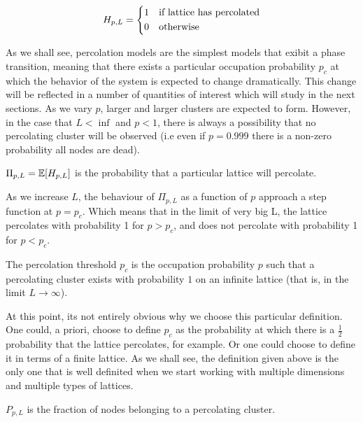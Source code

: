 \begin{defn}
\[
	H_{p,L} =
    \begin{dcases}
        1 & \text{if lattice has percolated} \\
        0 & \text{otherwise} \\
    \end{dcases}
\]
\end{defn}
As we shall see, percolation models are the simplest models that exibit a phase transition, meaning that there exists a particular occupation probability $p_c$ at which the behavior of the system is expected to change dramatically. This change will be reflected in a number of quantities of interest which will study in the next sections.
As we vary $p$, larger and larger clusters are expected to form. However, in the case that $L < \inf$ and $p < 1$, there is always a possibility that no percolating cluster will be observed (i.e even if $p = 0.999$ there is a non-zero probability all nodes are dead).

\begin{defn}
$\Pi_{p,L} = \operatorname{\mathbb{E}}[H_{p,L}]$ is the probability that a particular lattice will percolate.
\end{defn}

As we increase $L$, the behaviour of $\Pi_{p,L}$ as a function of $p$ approach a step function at $p=p_c$. Which means that in the limit of very big L, the lattice percolates with probability 1 for $p > p_c$, and does not percolate with probability 1 for $p < p_c$.

\begin{defn}
The percolation threshold $p_c$ is the occupation probability $p$ such that a percolating cluster exists with probability $1$ on an infinite lattice (that is, in the limit $L \rightarrow \infty $).
\end{defn}

At this point, its not entirely obvious why we choose this particular definition. One could, a priori, choose to define $p_c$ as the probability at which there is a $\frac{1}{2}$ probability that the lattice percolates, for example. Or one could choose to define it in terms of a finite lattice. As we shall see, the definition given above is the only one that is well definited when we start working with multiple dimensions and multiple types of lattices.

\begin{defn}
$P_{p,L}$ is the fraction of nodes belonging to a percolating cluster.
\end{defn}


